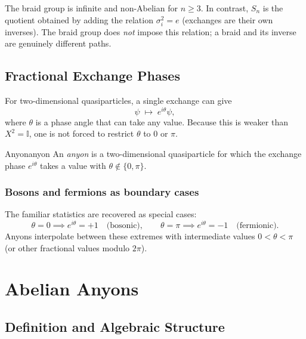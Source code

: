 \documentclass[11pt,a4paper]{article}
\newcommand{\id}{\mathbb{I}}
\begin{document}
The braid group is infinite and non-Abelian for $n \geq 3$.  In contrast,
$S_n$ is the quotient obtained by adding the relation $\sigma_i^2 = e$
(exchanges are their own inverses).  The braid group does \emph{not} impose
this relation; a braid and its inverse are genuinely different paths.

\subsection{Fractional Exchange Phases}

For two-dimensional quasiparticles, a single exchange can give
\[
  \psi \;\mapsto\; e^{i\theta}\psi,
\]
where $\theta$ is a phase angle that can take any value.  Because this is
weaker than $X^2 = \id$, one is not forced to restrict $\theta$ to $0$ or $\pi$.

\begin{defn}{Anyon}{anyon}
  An \emph{anyon} is a two-dimensional quasiparticle for which the exchange
  phase $e^{i\theta}$ takes a value with $\theta \notin \{0, \pi\}$.
\end{defn}

\subsubsection{Bosons and fermions as boundary cases}

The familiar statistics are recovered as special cases:
\[
  \theta = 0 \implies e^{i\theta} = +1 \quad\text{(bosonic)},
  \qquad
  \theta = \pi \implies e^{i\theta} = -1 \quad\text{(fermionic)}.
\]
Anyons interpolate between these extremes with intermediate values
$0 < \theta < \pi$ (or other fractional values modulo $2\pi$).

\section{Abelian Anyons}

\subsection{Definition and Algebraic Structure}
\end{document}

